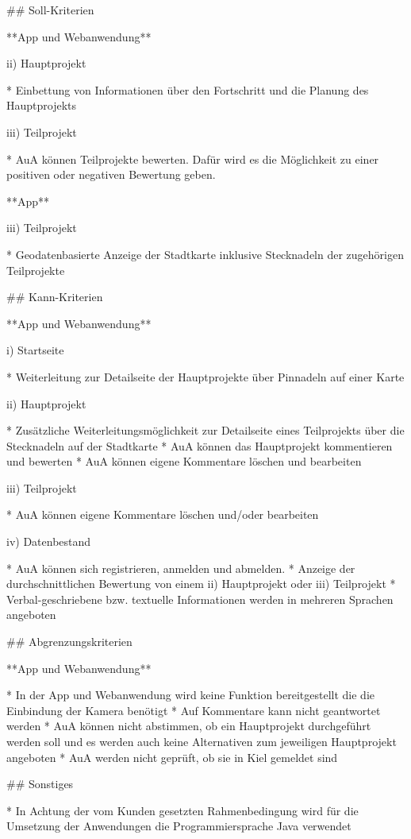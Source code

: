 \begin{markdown}
## Soll-Kriterien

**App und Webanwendung**

ii) Hauptprojekt

* Einbettung von Informationen über den Fortschritt und die Planung des Hauptprojekts

iii) Teilprojekt

* AuA können Teilprojekte bewerten. Dafür wird es die Möglichkeit zu einer positiven oder negativen Bewertung geben.

**App**

iii) Teilprojekt

* Geodatenbasierte Anzeige der Stadtkarte inklusive Stecknadeln der zugehörigen Teilprojekte

## Kann-Kriterien

**App und Webanwendung**

i) Startseite

* Weiterleitung zur Detailseite der Hauptprojekte über Pinnadeln auf einer Karte

ii) Hauptprojekt

* Zusätzliche Weiterleitungsmöglichkeit zur Detailseite eines Teilprojekts über die Stecknadeln auf der Stadtkarte
* AuA können das Hauptprojekt kommentieren und bewerten
* AuA können eigene Kommentare löschen und bearbeiten

iii) Teilprojekt

* AuA können eigene Kommentare löschen und/oder bearbeiten

iv) Datenbestand

* AuA können sich registrieren, anmelden und abmelden.
* Anzeige der durchschnittlichen Bewertung von einem ii) Hauptprojekt oder iii) Teilprojekt
* Verbal-geschriebene bzw. textuelle Informationen werden in mehreren Sprachen angeboten
\end{markdown}
\newpage

\begin{markdown}
## Abgrenzungskriterien

**App und Webanwendung**

* In der App und Webanwendung wird keine Funktion bereitgestellt die die Einbindung der Kamera benötigt
* Auf Kommentare kann nicht geantwortet werden
* AuA können nicht abstimmen, ob ein Hauptprojekt durchgeführt werden soll und es werden auch keine Alternativen zum jeweiligen Hauptprojekt angeboten
* AuA werden nicht geprüft, ob sie in Kiel gemeldet sind

## Sonstiges

* In Achtung der vom Kunden gesetzten Rahmenbedingung wird für die Umsetzung der Anwendungen die Programmiersprache Java verwendet
\end{markdown}